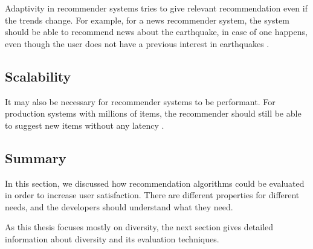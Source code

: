 Adaptivity in recommender systems tries to give relevant recommendation even if the trends change. For example, for a news recommender system, the system should be able to recommend news about the earthquake, in case of one happens, even though the user does not have a previous interest in earthquakes \cite{shani2011evaluating}.

\subsection{Scalability}

It may also be necessary for recommender systems to be performant. For production systems with millions of items, the recommender should still be able to suggest new items without any latency \cite{shani2011evaluating}.

\subsection{Summary}

In this section, we discussed how recommendation algorithms could be evaluated in order to increase user satisfaction. There are different properties for different needs, and the developers should understand what they need.

As this thesis focuses mostly on diversity, the next section gives detailed information about diversity and its evaluation techniques.

